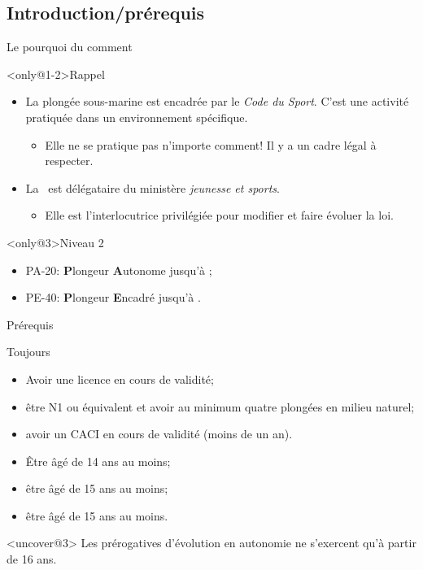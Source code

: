 \subsection{Introduction/prérequis}

\begin{frame}{Le pourquoi du comment}
\begin{block}<only@1-2>{Rappel}
\begin{itemize}
\item<1-> La plongée sous-marine est encadrée par le \emph{Code du Sport}.
C'est une activité pratiquée dans un \og environnement spécifique\fg.
\begin{itemize}
\item[$\Rightarrow$] Elle ne se pratique pas n'importe comment! Il
  y a un cadre légal à respecter.
\end{itemize}
\item<2> La \FFESSM\ est délégataire du ministère \textsl{jeunesse et sports}.
\begin{itemize}
\item[$\Rightarrow$] Elle est l'interlocutrice privilégiée pour modifier et
  faire évoluer la loi.
\end{itemize}
\end{itemize}
\end{block}
%
\begin{block}<only@3>{Niveau 2}
\begin{itemize}
\item PA-20: \textbf{P}longeur \textbf{A}utonome jusqu'à ;
\item PE-40: \textbf{P}longeur \textbf{E}ncadré jusqu'à .
\end{itemize}
\end{block}
\end{frame}

\begin{frame}{Prérequis}
\begin{block}{Toujours}
\begin{itemize}
\item Avoir une licence en cours de validité;
\item être N1 ou équivalent et avoir au minimum quatre plongées en
  milieu naturel;
\item avoir un CACI en cours de validité (moins de un an).
\end{itemize}
\end{block}
\begin{itemize}[<uncover@2->]
\item[PE-40] Être âgé de 14 ans au moins;
\item[PA-20] être âgé de 15 ans au moins;
\item[Niveau~2] être âgé de 15 ans au moins.
\end{itemize}
\begin{alertblock}<uncover@3>{}
Les prérogatives d'évolution en autonomie ne s'exercent qu'à partir de 16 ans.
\end{alertblock}
\end{frame}

